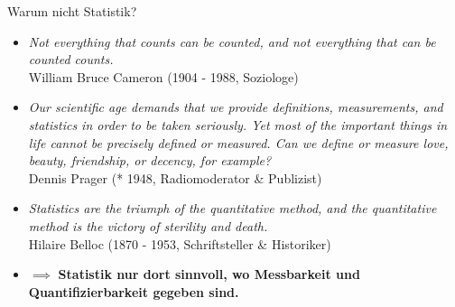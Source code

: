 \documentclass[
  10pt,
  ignorenonframetext,
]{beamer}
\providecommand{\tightlist}{%
  \setlength{\itemsep}{0pt}\setlength{\parskip}{0pt}}
\begin{document}
\begin{frame}{Warum nicht Statistik?}
\label{warum-nicht-statistik-1}
\begin{itemize}[<+->]
\tightlist
\item
  \emph{Not everything that counts can be counted, and not everything
  that can be counted counts.}\\
  William Bruce Cameron (1904 - 1988, Soziologe)
\end{itemize}

\begin{itemize}[<+->]
\tightlist
\item
  \emph{Our scientific age demands that we provide definitions,
  measurements, and statistics in order to be taken seriously. Yet most
  of the important things in life cannot be precisely defined or
  measured. Can we define or measure love, beauty, friendship, or
  decency, for example?}\\
  Dennis Prager (* 1948, Radiomoderator \& Publizist)
\end{itemize}

\begin{itemize}[<+->]
\tightlist
\item
  \emph{Statistics are the triumph of the quantitative method, and the
  quantitative method is the victory of sterility and death.}\\
  Hilaire Belloc (1870 - 1953, Schriftsteller \& Historiker)
\end{itemize}

\begin{itemize}[<+->]
\tightlist
\item
  \(\implies\) \textbf{Statistik nur dort sinnvoll, wo Messbarkeit und
  Quantifizierbarkeit gegeben sind.}
\end{itemize}
\end{frame}
\end{document}
